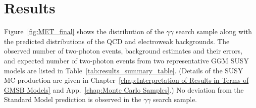 \documentclass[dissertation.tex]{subfiles}
\begin{document}
%
%

\section{Results}
\label{sec:Results}

Figure~\ref{fig:MET_final} shows the \MET distribution of the $\gamma\gamma$ search sample along with the predicted \MET distributions of the QCD and electroweak backgrounds.  The observed number of two-photon events, background estimates and their errors, and expected number of two-photon events from two representative GGM SUSY models are listed in Table~\ref{tab:results_summary_table}.  (Details of the SUSY MC production are given in Chapter~\ref{chap:Interpretation of Results in Terms of GMSB Models} and App.~\ref{chap:Monte Carlo Samples}.)  No deviation from the Standard Model prediction is observed in the $\gamma\gamma$ search sample.
\end{document}
